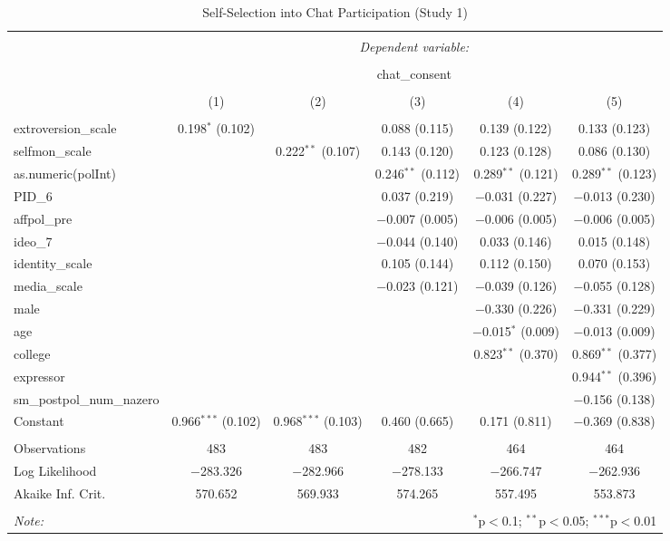 
\begin{table}[H] \centering 
  \caption{Self-Selection into Chat Participation (Study 1)} 
  \label{tab:s1_selection_into_chat} 
\begin{tabular}{@{\extracolsep{5pt}}lccccc} 
\\[-1.8ex]\hline 
\hline \\[-1.8ex] 
 & \multicolumn{5}{c}{\textit{Dependent variable:}} \\ 
\cline{2-6} 
\\[-1.8ex] & \multicolumn{5}{c}{chat\_consent} \\ 
\\[-1.8ex] & (1) & (2) & (3) & (4) & (5)\\ 
\hline \\[-1.8ex] 
 extroversion\_scale & 0.198$^{*}$ (0.102) &  & 0.088 (0.115) & 0.139 (0.122) & 0.133 (0.123) \\ 
  selfmon\_scale &  & 0.222$^{**}$ (0.107) & 0.143 (0.120) & 0.123 (0.128) & 0.086 (0.130) \\ 
  as.numeric(polInt) &  &  & 0.246$^{**}$ (0.112) & 0.289$^{**}$ (0.121) & 0.289$^{**}$ (0.123) \\ 
  PID\_6 &  &  & 0.037 (0.219) & $-$0.031 (0.227) & $-$0.013 (0.230) \\ 
  affpol\_pre &  &  & $-$0.007 (0.005) & $-$0.006 (0.005) & $-$0.006 (0.005) \\ 
  ideo\_7 &  &  & $-$0.044 (0.140) & 0.033 (0.146) & 0.015 (0.148) \\ 
  identity\_scale &  &  & 0.105 (0.144) & 0.112 (0.150) & 0.070 (0.153) \\ 
  media\_scale &  &  & $-$0.023 (0.121) & $-$0.039 (0.126) & $-$0.055 (0.128) \\ 
  male &  &  &  & $-$0.330 (0.226) & $-$0.331 (0.229) \\ 
  age &  &  &  & $-$0.015$^{*}$ (0.009) & $-$0.013 (0.009) \\ 
  college &  &  &  & 0.823$^{**}$ (0.370) & 0.869$^{**}$ (0.377) \\ 
  expressor &  &  &  &  & 0.944$^{**}$ (0.396) \\ 
  sm\_postpol\_num\_nazero &  &  &  &  & $-$0.156 (0.138) \\ 
  Constant & 0.966$^{***}$ (0.102) & 0.968$^{***}$ (0.103) & 0.460 (0.665) & 0.171 (0.811) & $-$0.369 (0.838) \\ 
 \hline \\[-1.8ex] 
Observations & 483 & 483 & 482 & 464 & 464 \\ 
Log Likelihood & $-$283.326 & $-$282.966 & $-$278.133 & $-$266.747 & $-$262.936 \\ 
Akaike Inf. Crit. & 570.652 & 569.933 & 574.265 & 557.495 & 553.873 \\ 
\hline 
\hline \\[-1.8ex] 
\textit{Note:}  & \multicolumn{5}{r}{$^{*}$p$<$0.1; $^{**}$p$<$0.05; $^{***}$p$<$0.01} \\ 
\end{tabular} 
\end{table} 

